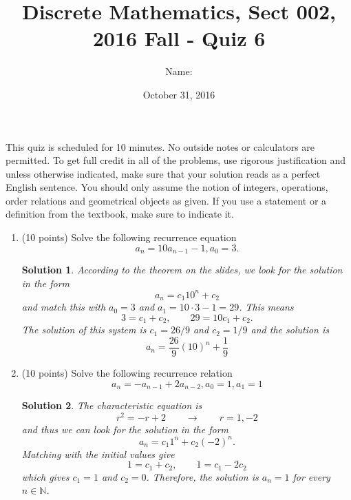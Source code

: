 \documentclass[11pt]{preprint}
\title{Discrete Mathematics, Sect 002, 2016 Fall - Quiz 6}
\author{Name:}
\institute{Courant Institute of Mathematical Sciences, NYU}
\date{October 31, 2016}
\newtheorem*{solution}{Solution}
\begin{document}
\maketitle

This quiz is scheduled for 10 minutes. No outside notes or calculators are permitted. To get full credit  in all of the problems, use rigorous justification and unless otherwise indicated, make sure that your solution reads as a perfect English sentence. You should only assume the notion of integers, operations, order relations and geometrical objects as given. If you use a statement or a definition from the textbook, make sure to indicate it.
\vspace{0.2cm}

\begin{enumerate}

\item (10 points)  Solve the following recurrence equation
\[
a_n=10a_{n-1}-1, a_0=3.
\]

\begin{solution}
According to the theorem on the slides, we look for the solution in the form
\[
a_n=c_1 10^n+c_2
\]
and match this with $a_0=3$ and $a_1=10\cdot 3-1=29$. This means
\[
3=c_1+c_2,\qquad 29=10c_1+c_2.
\]
The solution of this system is $c_1= 26/9$ and $c_2=1/9$ and the solution is
\[
a_n=\frac{26}{9}(10)^n+\frac{1}{9}
\]
\end{solution}

\item(10 points) Solve the following recurrence relation
\[
a_n=-a_{n-1}+2a_{n-2}, a_0=1, a_1=1
\]

\begin{solution}
The characteristic equation is
\[
r^2=-r+2\qquad\to\qquad r=1,-2
\]
and thus we can look for the solution in the form
\[
a_n=c_1 1^n+c_2(-2)^n.
\]
Matching with the initial values give
\[
1=c_1+c_2,\qquad 1=c_1-2c_2
\]
which gives $c_1=1$ and $c_2=0$. Therefore, the solution is $a_n=1$ for every $n\in\mathbb{N}$.
\end{solution}
\end{enumerate}
\end{document}
